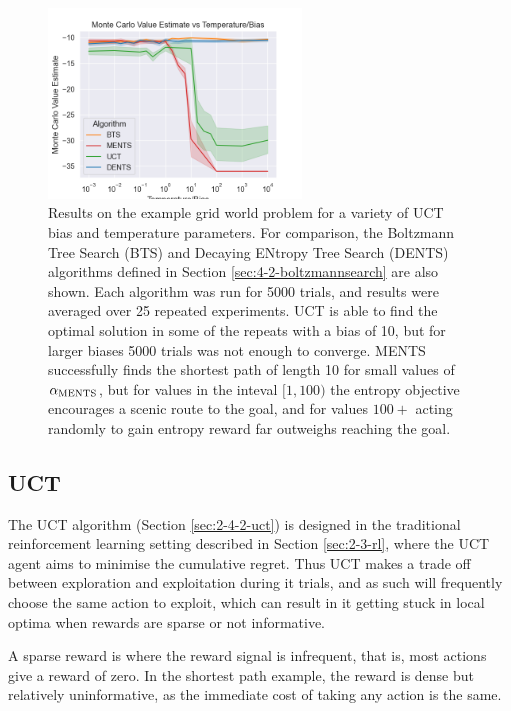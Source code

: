     \begin{figure}
        \centering
        \includegraphics[width=0.6\textwidth]{figures/ch4/grid_world_sec_1_results.png}
        \caption[Results on the example grid world problem for a variety of bias and temperature parameters.]{Results on the example grid world problem for a variety of UCT bias and temperature parameters. For comparison, the Boltzmann Tree Search (BTS) and Decaying ENtropy Tree Search (DENTS) algorithms defined in Section \ref{sec:4-2-boltzmannsearch} are also shown. Each algorithm was run for 5000 trials, and results were averaged over 25 repeated experiments. UCT is able to find the optimal solution in some of the repeats with a bias of 10, but for larger biases 5000 trials was not enough to converge. MENTS successfully finds the shortest path of length 10 for small values of ${\alpha_{{\textnormal{MENTS}}}}$, but for values in the inteval $[1,100)$ the entropy objective encourages a scenic route to the goal, and for values $100+$ acting randomly to gain entropy reward far outweighs reaching the goal. }
        \label{fig:4:shortest_path_intro_results}
    \end{figure}


    \subsection{UCT}

        The UCT algorithm (Section \ref{sec:2-4-2-uct}) is designed in the traditional reinforcement learning setting described in Section \ref{sec:2-3-rl}, where the UCT agent aims to minimise the cumulative regret. Thus UCT makes a trade off between exploration and exploitation during it trials, and as such will frequently choose the same action to exploit, which can result in it getting stuck in local optima when rewards are sparse or not informative. 

        A sparse reward is where the reward signal is infrequent, that is, most actions give a reward of zero. In the shortest path example, the reward is dense but relatively uninformative, as the immediate cost of taking any action is the same. 

